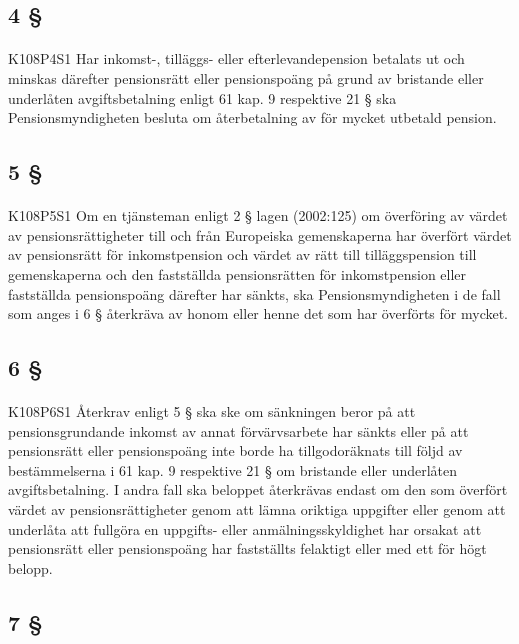 \documentclass[a4paper,notitlepage,openany,10pt]{book}
\begin{document}
\subsection*{4 §}
\paragraph*{}
{\tiny K108P4S1}
Har inkomst-, tilläggs- eller efterlevandepension betalats ut och minskas därefter pensionsrätt eller pensionspoäng på grund av bristande eller underlåten avgiftsbetalning enligt 61 kap. 9 respektive 21 § ska Pensionsmyndigheten besluta om återbetalning av för mycket utbetald pension.
\subsection*{5 §}
\paragraph*{}
{\tiny K108P5S1}
Om en tjänsteman enligt 2 § lagen (2002:125) om överföring av värdet av pensionsrättigheter till och från Europeiska gemenskaperna har överfört värdet av pensionsrätt för inkomstpension och värdet av rätt till tilläggspension till gemenskaperna och den fastställda pensionsrätten för inkomstpension eller fastställda pensionspoäng därefter har sänkts, ska Pensionsmyndigheten i de fall som anges i 6 § återkräva av honom eller henne det som har överförts för mycket.
\subsection*{6 §}
\paragraph*{}
{\tiny K108P6S1}
Återkrav enligt 5 § ska ske om sänkningen beror på att pensionsgrundande inkomst av annat förvärvsarbete har sänkts eller på att pensionsrätt eller pensionspoäng inte borde ha tillgodoräknats till följd av bestämmelserna i 61 kap. 9 respektive 21 § om bristande eller underlåten avgiftsbetalning. I andra fall ska beloppet återkrävas endast om den som överfört värdet av pensionsrättigheter genom att lämna oriktiga uppgifter eller genom att underlåta att fullgöra en uppgifts- eller anmälningsskyldighet har orsakat att pensionsrätt eller pensionspoäng har fastställts felaktigt eller med ett för högt belopp.
\subsection*{7 §}
\end{document}
